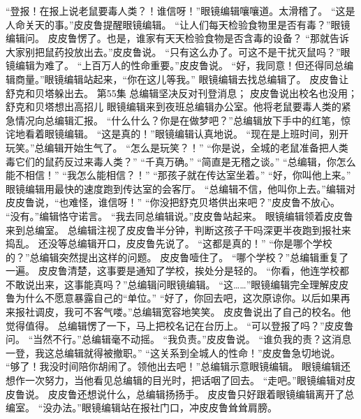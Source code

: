 \documentclass[a4paper,12pt,UTF8,twoside]{ctexbook}
\begin{document}
        “登报！在报上说老鼠要毒人类？！谁信呀！”眼镜编辑嚷嚷道。太滑稽了。 
        “这是人命关天的事。”皮皮鲁提醒眼镜编辑。 
        “让人们每天检验食物里是否有毒？”眼镜编辑问。 
        皮皮鲁愣了。也是，谁家有天天检验食物是否含毒的设备？ 
        “那就告诉大家别把鼠药投放出去。”皮皮鲁说。 
        “只有这么办了。可这不是干扰灭鼠吗？”眼镜编辑为难了。 
        “上百万人的性命重要。”皮皮鲁说。 
        “好，我同意！但还得同总编辑商量。”眼镜编辑站起来，“你在这儿等我。” 
        眼镜编辑去找总编辑了。 
        皮皮鲁让舒克和贝塔躲出去。   第55集 
        总编辑坚决反对刊登消息； 
        皮皮鲁说出校名也没用； 
        舒克和贝塔想出高招儿   
        眼镜编辑来到夜班总编辑办公室。他将老鼠要毒人类的紧急情况向总编辑汇报。 
        “什么什么？你是在做梦吧？”总编辑放下手中的红笔，惊诧地看着眼镜编辑。 
        “这是真的！”眼镜编辑认真地说。 
        “现在是上班时间，别开玩笑。”总编辑开始生气了。 
        “怎么是玩笑？！” 
        “你是说，全城的老鼠准备把人类毒它们的鼠药反过来毒人类？” 
        “千真万确。” 
        “简直是无稽之谈。” 
        “总编辑，你怎么能不相信！” 
        “我怎么能相信？！” 
        “那孩子就在传达室坐着。” 
        “好，你叫他上来。” 
         眼镜编辑用最快的速度跑到传达室的会客厅。 
        “总编辑不信，他叫你上去。”编辑对皮皮鲁说，“也难怪，谁信呀！” 
        “你没把舒克贝塔供出来吧？”皮皮鲁不放心。 
        “没有。”编辑恪守诺言。 
        “我去同总编辑说。”皮皮鲁站起来。 
        眼镜编辑领着皮皮鲁来到总编室。 
        总编辑注视了皮皮鲁半分钟，判断这孩子干吗深更半夜跑到报社来捣乱。 
        还没等总编辑开口，皮皮鲁先说了。 
        “这都是真的！” 
        “你是哪个学校的？”总编辑突然提出这样的问题。 
        皮皮鲁噎住了。 
        “哪个学校？”总编辑重复了一遍。 
        皮皮鲁清楚，这事要是通知了学校，挨处分是轻的。 
        “你看，他连学校都不敢说出来，这事能真吗？”总编辑问眼镜编辑。 
        “这……”眼镜编辑完全理解皮皮鲁为什么不愿意暴露自己的“单位。” 
        “好了，你回去吧，这次原谅你。以后如果再来报社调皮，我可不客气喽。”总编辑宽容地笑笑。 
        皮皮鲁说出了自己的校名。他觉得值得。 
        总编辑愣了一下，马上把校名记在台历上。 
        “可以登报了吗？”皮皮鲁问。 
        “当然不行。”总编辑毫不动摇。 
        “我负责。”皮皮鲁说。 
        “谁负我的责？这消息一登，我这总编辑就得被撤职。” 
        “这关系到全城人的性命！”皮皮鲁急切地说。 
        “够了！我没时间陪你胡闹了。领他出去吧！”总编辑示意眼镜编辑。 
        眼镜编辑还想作一次努力，当他看见总编辑的目光时，把话咽了回去。 
        “走吧。”眼镜编辑对皮皮鲁说。 
        皮皮鲁还想说什么，总编辑扬扬手。 
        皮皮鲁只好跟着眼镜编辑离开了总编室。 
        “没办法。”眼镜编辑站在报社门口，冲皮皮鲁耸耸肩膀。 
\end{document}
